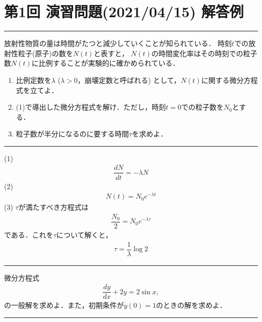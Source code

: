 \section*{第1回 演習問題(2021/04/15) 解答例}
%
\hrule
\vspace*{.2cm}
\enshu
放射性物質の量は時間がたつと減少していくことが知られている．
時刻$t$での放射性粒子(原子)の数を$N(t)$と表すと，
$N(t)$の時間変化率はその時刻での粒子数$N(t)$に比例することが実験的に確かめられている．
\begin{enumerate}[(1)]
  \item 比例定数を$\lambda$ ($\lambda>0$，崩壊定数と呼ばれる) として，$N(t)$に関する微分方程式を立てよ．
  \item (1)で導出した微分方程式を解け．ただし，時刻$t=0$での粒子数を$N_0$とする．
  \item 粒子数が半分になるのに要する時間$\tau$を求めよ．
\end{enumerate}
\hrule
\vspace*{.2cm}

\setcounter{section}{1}
\noindent
(1)
\begin{align}
 \dfrac{dN}{dt} = -\lambda N 
\end{align}
(2)
\begin{align}
  N(t) = N_{0}e^{-\lambda t}
\end{align}
(3) $\tau$が満たすべき方程式は
\begin{align}
  \dfrac{N_0}{2} = N_0 e^{-\lambda \tau} 
\end{align}
である．これを$\tau$について解くと，
\begin{align}
  \tau = \dfrac{1}{\lambda} \log 2 
\end{align}

\newpage
\hrule
\vspace*{.2cm}
\enshu
微分方程式
\begin{align*}
  \dfrac{dy}{dx} + 2y = 2\sin x, 
\end{align*}
の一般解を求めよ．また，初期条件が$y(0)=1$のときの解を求めよ．
\vspace*{.2cm}
\hrule
\vspace*{.2cm}


